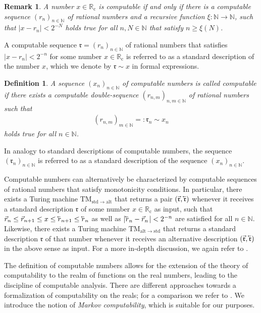 \documentclass[conference]{IEEEtran}
\def\NN{{\mathbb N}}
\def\RR{{\mathbb R}}
\newcommand{\RRc}{\RR_{\mathrm{c}}}
\newcommand{\TM}{\mathrm{TM}}
\newcommand{\cev}[1]{\reflectbox{\ensuremath{\vec{\reflectbox{\ensuremath{#1}}}}}}
\newtheorem{Definition}[Theorem]{Definition}
\newtheorem{Remark}[Theorem]{Remark}
\begin{document}
	\begin{Remark}  A number \(x\in\RRc\) is computable if and only if there is a computable sequence \((r_n)_{n\in\NN}\) 
					of rational numbers and a recursive function \(\xi:\NN\to\NN\), such that \(|x-r_n|< 2^{-N}\)
					holds true for all \(n,N\in\NN\) that satisfy \(n \geq \xi(N)\). 
	\end{Remark}

	\noindent A computable sequence \(\mathfrak{r} = (r_n)_{n\in\NN}\) of rational numbers that satisfies \(|x-r_n|<2^{-n}\) for some number \(x\in\RRc\) 
	is referred to as a standard description of the number \(x\), which we denote by \(\mathfrak{r}\sim x\) in formal expressions. 
	
	\begin{Definition}	A sequence \((x_n)_{n\in\NN}\) of computable numbers is called computable if there exists a computable double-sequence
						\((r_{n,m})_{n,m\in\NN}\) of rational numbers such that 
						\begin{align} (r_{n,m})_{m\in\NN} =: \mathfrak{r}_n \sim x_n
						\end{align}
						holds true for all \(n\in\NN\).
	\end{Definition}
	
	In analogy to standard descriptions of computable numbers, the sequence \((\mathfrak{r}_n)_{n\in\NN}\) is referred to as a standard description
	of the sequence \((x_n)_{n\in\NN}\).

	Computable numbers can alternatively be characterized by computable sequences of rational numbers that satisfy monotonicity conditions. 
	In particular, there exists a Turing machine \(\TM_{\mathrm{std}\rightarrow\mathrm{alt}}\) that returns a pair \((\vec{\mathfrak{r}}, \cev{\mathfrak{r}})\) 
	whenever it receives a standard description \(\mathfrak{r}\) of some number \(x\in\RRc\) as input, such that
	\(	\vec{r}_n \leq \vec{r}_{n+1} \leq x \leq \cev{r}_{n+1} \leq \cev{r}_n
	\)
	as well as 
	\(	| \cev{r}_n - \vec{r}_n\hspace{1pt}| < 2^{-n}
	\)
	are satisfied for all \(n\in\NN\). Likewise, there exists a Turing machine \(\TM_{\mathrm{alt}\rightarrow\mathrm{std}}\) that returns a standard description 
	\(\mathfrak{r}\) of that number whenever it receives an alternative description \((\vec{\mathfrak{r}}, \cev{\mathfrak{r}})\) in the above sense as input. 
	For a more in-depth discussion, we again refer to \cite{PoRi17}. %

	The definition of computable numbers allows for the extension of the theory of computability to the realm of functions on the real numbers, 
	leading to the discipline of computable analysis. There are different approaches towards a formalization of computability on the reals; for a comparison 
	we refer to \cite{AB14}. We introduce the notion of \emph{Markov computability}, which is suitable for our purposes. 
\end{document}
